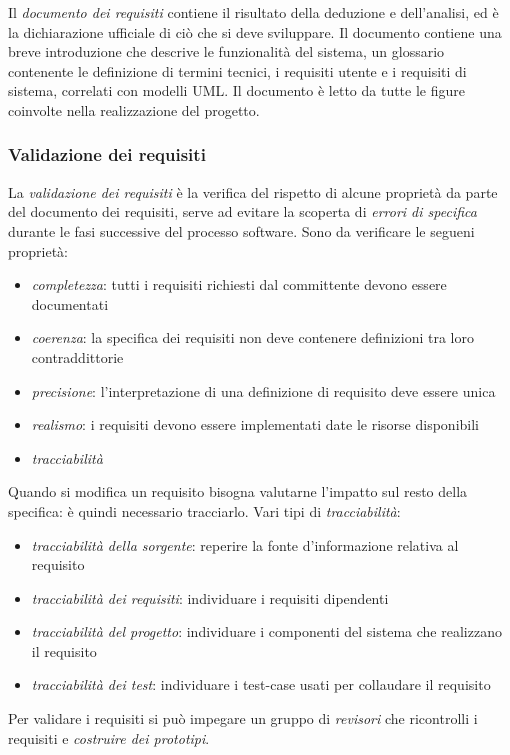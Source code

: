 \documentclass[11pt]{article}
\begin{document}
Il \textit{documento dei requisiti} contiene il risultato della deduzione e dell'analisi, ed è la dichiarazione ufficiale 
di ciò che si deve sviluppare. Il documento contiene una breve introduzione che descrive le funzionalità del sistema, un 
glossario contenente le definizione di termini tecnici, i requisiti utente e i requisiti di sistema, correlati con modelli 
UML. Il documento è letto da tutte le figure coinvolte nella realizzazione del progetto.
\subsubsection*{Validazione dei requisiti}
La \textit{validazione dei requisiti} è la verifica del rispetto di alcune proprietà da parte del documento dei requisiti,
serve ad evitare la scoperta di \textit{errori di specifica} durante le fasi successive del processo software. Sono da 
verificare le segueni proprietà:
\begin{itemize}
    \item \textit{completezza}: tutti i requisiti richiesti dal committente devono essere documentati
    \item \textit{coerenza}: la specifica dei requisiti non deve contenere definizioni tra loro contraddittorie
    \item \textit{precisione}: l'interpretazione di una definizione di requisito deve essere unica
    \item \textit{realismo}: i requisiti devono essere implementati date le risorse disponibili
    \item \textit{tracciabilità}
\end{itemize}

Quando si modifica un requisito bisogna valutarne l'impatto sul resto della specifica: è quindi necessario tracciarlo.
Vari tipi di \textit{tracciabilità}:
\begin{itemize}
    \item \textit{tracciabilità della sorgente}: reperire la fonte d'informazione relativa al requisito
    \item \textit{tracciabilità dei requisiti}: individuare i requisiti dipendenti
    \item \textit{tracciabilità del progetto}: individuare i componenti del sistema che realizzano il requisito
    \item \textit{tracciabilità dei test}: individuare i test-case usati per collaudare il requisito
\end{itemize}

Per validare i requisiti si può impegare un gruppo di \textit{revisori} che ricontrolli i requisiti e \textit{costruire 
dei prototipi}.
\end{document}
